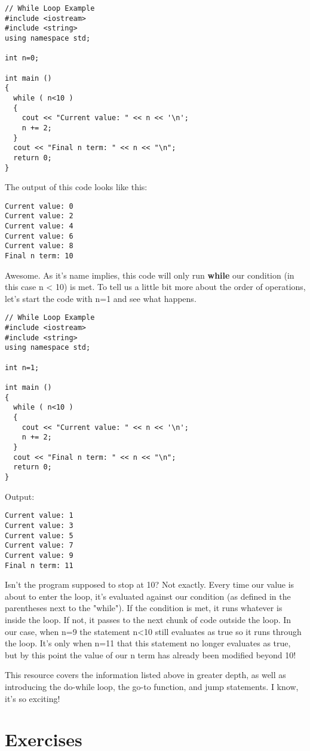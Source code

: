 \documentclass[a4paper]{article}
\begin{document}
\begin{verbatim}
// While Loop Example
#include <iostream>
#include <string>
using namespace std;

int n=0;

int main ()
{
  while ( n<10 )
  {
    cout << "Current value: " << n << '\n';
    n += 2;
  }
  cout << "Final n term: " << n << "\n";
  return 0;
}
\end{verbatim}

The output of this code looks like this:
\begin{verbatim}
Current value: 0
Current value: 2
Current value: 4
Current value: 6
Current value: 8
Final n term: 10
\end{verbatim}

Awesome. As it's name implies, this code will only run \textbf{while} our condition (in this case n < 10) is met. To tell us a little bit more about the order of operations, let's start the code with n=1 and see what happens.

\begin{verbatim}
// While Loop Example
#include <iostream>
#include <string>
using namespace std;

int n=1;

int main ()
{
  while ( n<10 )
  {
    cout << "Current value: " << n << '\n';
    n += 2;
  }
  cout << "Final n term: " << n << "\n";
  return 0;
}
\end{verbatim}
Output:
\begin{verbatim}
Current value: 1
Current value: 3
Current value: 5
Current value: 7
Current value: 9
Final n term: 11
\end{verbatim}

Isn't the program supposed to stop at 10? Not exactly. Every time our value is about to enter the loop, it's evaluated against our condition (as defined in the parentheses next to the "while"). If the condition is met, it runs whatever is inside the loop. If not, it passes to the next chunk of code outside the loop. In our case, when n=9 the statement n<10 still evaluates as true so it runs through the loop. It's only when n=11 that this statement no longer evaluates as true, but by this point the value of our n term has already been modified beyond 10!

This resource \cite{control} covers the information listed above in greater depth, as well as introducing the do-while loop, the go-to function, and jump statements. I know, it's so exciting!

\section{Exercises}
\end{document}
